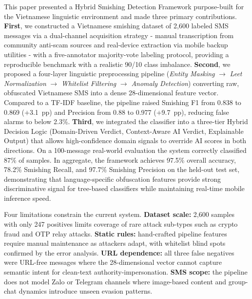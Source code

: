 \documentclass[conference]{IEEEtran}
\begin{document}
This paper presented a Hybrid Smishing Detection Framework purpose-built for
the Vietnamese linguistic environment and made three primary contributions.
\textbf{First}, we constructed a Vietnamese smishing dataset of 2,600 labeled
SMS messages via a dual-channel acquisition strategy - manual transcription
from community anti-scam sources and real-device extraction via mobile backup
utilities - with a five-annotator majority-vote labeling protocol, providing a
reproducible benchmark with a realistic 90/10 class imbalance.
\textbf{Second}, we proposed a four-layer linguistic preprocessing pipeline
(\textit{Entity Masking} $\to$ \textit{Leet Normalization} $\to$
\textit{Whitelist Filtering} $\to$ \textit{Anomaly Detection}) converting raw,
obfuscated Vietnamese SMS into a dense 28-dimensional feature vector. Compared
to a TF-IDF baseline, the pipeline raised Smishing F1 from 0.838 to
0.869 ($+$3.1~pp) and Precision from 0.88 to 0.977
($+$9.7~pp), reducing false alarms to below 2.3\%.
\textbf{Third}, we integrated the classifier into a three-tier Hybrid Decision
Logic (Domain-Driven Verdict, Context-Aware AI Verdict, Explainable Output)
that allows high-confidence domain signals to override AI scores in both
directions. On a 100-message real-world evaluation the system correctly
classified 87\% of samples. In aggregate, the framework achieves
97.5\% overall accuracy, 78.2\% Smishing Recall, and
97.7\% Smishing Precision on the held-out test set, demonstrating that
language-specific obfuscation features provide strong discriminative signal for
tree-based classifiers while maintaining real-time mobile inference speed.

Four limitations constrain the current system. \textbf{Dataset scale:} 2,600
samples with only 247 positives limits coverage of rare attack sub-types such
as crypto fraud and OTP relay attacks. \textbf{Static rules:} hand-crafted
pipeline features require manual maintenance as attackers adapt, with whitelist
blind spots confirmed by the error analysis. \textbf{URL dependence:} all three
false negatives were URL-free messages where the 28-dimensional vector cannot
capture semantic intent for clean-text authority-impersonation. \textbf{SMS
scope:} the pipeline does not model Zalo or Telegram channels where image-based
content and group-chat dynamics introduce unseen evasion patterns.
\end{document}
